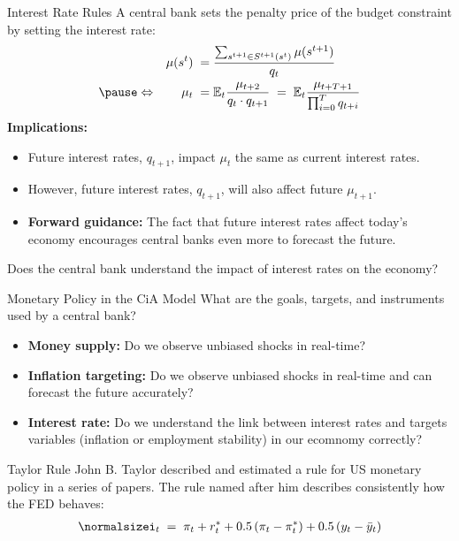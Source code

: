 \documentclass[10pt,c,aspectratio=1610,handout]{beamer}
\begin{document}
\begin{frame}{Interest Rate Rules}%
  A central bank sets the penalty price of the budget constraint by setting the interest rate:%
  \begin{align}%
    \mu(s^t) \; = & \; \frac{\sum_{s^{t+1} \in S^{t+1}(s^t)} \mu(s^{t+1})}{q_t}\notag\\%
    \pause%
    \Leftrightarrow \quad \quad \mu_t \; = & \; \mathbb{E}_t \frac{\mu_{t+2}}{q_t \cdot q_{t+1}} \; = \; \mathbb{E}_t \frac{\mu_{t+T+1}}{\prod_{i=0}^T q_{t+i}}%
  \end{align}%
  \pause%
  \textbf{Implications:}%
  \begin{itemize}%
    \item[$\blacktriangleright$] Future interest rates, $q_{t+1}$, impact $\mu_t$ the same as current interest rates.%
    \item[$\blacktriangleright$] However, future interest rates, $q_{t+1}$, will also affect future $\mu_{t+1}$.%
    \pause%
    \item[$\blacktriangleright$] \textbf{Forward guidance:} The fact that future interest rates affect today's economy encourages central banks even more to forecast the future.%
  \end{itemize}%
  \vspace{0.1in}%
  \pause%
  \begin{center}%
    Does the central bank understand the impact of interest rates on the economy?%
  \end{center}%
\end{frame}%
\begin{frame}{Monetary Policy in the CiA Model}%
  What are the goals, targets, and instruments used by a central bank?%
  \begin{itemize}%
    \item \textbf{Money supply:} Do we observe unbiased shocks in real-time?%
    \item \textbf{Inflation targeting:} Do we observe unbiased shocks in real-time and can forecast the future accurately?%
    \item \textbf{Interest rate:} Do we understand the link between interest rates and targets variables (inflation or employment stability) in our ecomnomy correctly?%
  \end{itemize}%
  \pause%
  \begin{block}{Taylor Rule}%
    \small%
    John B. Taylor described and estimated a rule for US monetary policy in a series of papers. The rule named after him describes consistently how the FED behaves:%
    \begin{align}%
      \normalsize%
      i_t \; = \; \pi_t + r_t^* + 0.5\left(\pi_t-\pi_t^*\right) + 0.5\left(y_t - \bar{y}_t\right)%
    \end{align}%
  \end{block}%
\end{frame}%
\end{document}
